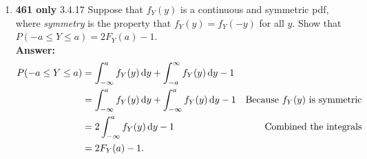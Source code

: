 \documentclass{article}
\begin{document}
\begin{enumerate}
        \item\textbf{461 only} 3.4.17 Suppose that $f_Y(y)$ is a continuous and symmetric pdf, where \textit{symmetry} is the property that $f_Y(y) = f_Y(-y)$ for all $y$. Show that $P(-a \leq Y \leq a) = 2F_Y(a)-1$.\\
        \textbf{Answer: }
            \begin{align*}
                P(-a \leq Y \leq a) &= \int_{-\infty}^af_Y(y)\dif y + \int_{-a}^\infty f_Y(y)\dif y-1\\
                &= \int_{-\infty}^af_Y(y)\dif y + \int_{-\infty}^a f_Y(y)\dif y-1 & \text{Because $f_Y(y)$ is symmetric}\\
                &= 2\int_{-\infty}^a f_Y(y)\dif y - 1 & \text{Combined the integrals}\\
                &= 2F_Y(a)-1.
            \end{align*}
    \end{enumerate}
    
\end{document}
